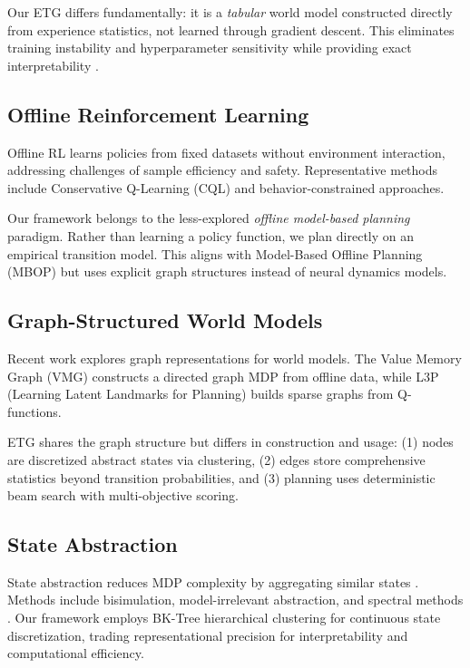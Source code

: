 \documentclass[letterpaper]{article}
\begin{document}
Our ETG differs fundamentally: it is a \textit{tabular} world model constructed directly from experience statistics, not learned through gradient descent. This eliminates training instability and hyperparameter sensitivity while providing exact interpretability \cite{zhu2023vmg}.

\subsection{Offline Reinforcement Learning}

Offline RL learns policies from fixed datasets without environment interaction, addressing challenges of sample efficiency and safety. Representative methods include Conservative Q-Learning (CQL) and behavior-constrained approaches.

Our framework belongs to the less-explored \textit{offline model-based planning} paradigm. Rather than learning a policy function, we plan directly on an empirical transition model. This aligns with Model-Based Offline Planning (MBOP) \cite{argenson2021mbop} but uses explicit graph structures instead of neural dynamics models.

\subsection{Graph-Structured World Models}

Recent work explores graph representations for world models. The Value Memory Graph (VMG) \cite{zhu2023vmg} constructs a directed graph MDP from offline data, while L3P (Learning Latent Landmarks for Planning) \cite{zhang2021l3p} builds sparse graphs from Q-functions.

ETG shares the graph structure but differs in construction and usage: (1) nodes are discretized abstract states via clustering, (2) edges store comprehensive statistics beyond transition probabilities, and (3) planning uses deterministic beam search with multi-objective scoring.

\subsection{State Abstraction}

State abstraction reduces MDP complexity by aggregating similar states \cite{abel2018abstraction}. Methods include bisimulation, model-irrelevant abstraction, and spectral methods \cite{starre2022survey}. Our framework employs BK-Tree hierarchical clustering for continuous state discretization, trading representational precision for interpretability and computational efficiency.
\end{document}
